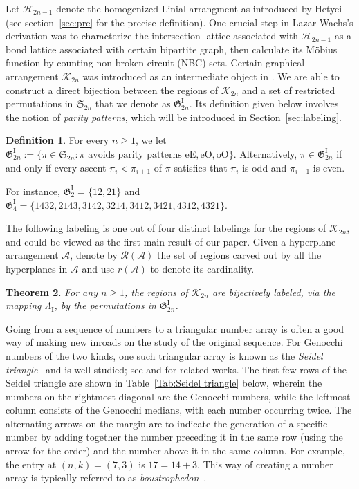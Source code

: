 \documentclass[11pt,reqno]{amsart}
\numberwithin{equation}{section}
\theoremstyle{plain}
\newtheorem{theorem}{Theorem}[section]
\theoremstyle{definition}
\newtheorem{Def}[theorem]{Definition}
\newcommand{\A}{\mathcal{A}}
\renewcommand{\S}{\mathfrak{S}}
\newcommand{\fG}{\mathfrak{G}}
\newcommand{\cH}{\mathcal{H}}
\newcommand{\cK}{\mathcal{K}}
\newcommand{\cR}{\mathcal{R}}
\newcommand{\GI}{\fG^{\mathrm{I}}}
\def\oO{\mathrm{oO}}
\def\eE{\mathrm{eE}}
\def\eO{\mathrm{eO}}
\begin{document}
Let $\cH_{2n-1}$ denote the homogenized Linial arrangment as introduced by Hetyei~\cite{het19} (see section~\ref{sec:pre} for the precise definition). One crucial step in Lazar-Wachs's derivation was to characterize the intersection lattice associated with $\cH_{2n-1}$ as a bond lattice associated with certain bipartite graph, then calculate its M\"obius function by counting non-broken-circuit (NBC) sets. Certain graphical arrangement $\cK_{2n}$ was introduced as an intermediate object in \cite[Thm.~3.2]{LW22}. We are able to construct a direct bijection between the regions of $\cK_{2n}$ and a set of restricted permutations in $\S_{2n}$ that we denote as $\GI_{2n}$. Its definition given below involves the notion of {\it parity patterns}, which will be introduced in Section~\ref{sec:labeling}. 

\begin{Def}\label{def:G-I}
	For every $n\ge 1$, we let $\GI_{2n} :=\{ \pi \in \S_{2n}: \pi \text{ avoids parity patterns }\eE,\eO,\oO \}$. Alternatively, $\pi \in \GI_{2n}$ if and only if every ascent $\pi_i<\pi_{i+1}$ of $\pi$ satisfies that $\pi_i$ is odd and $\pi_{i+1}$ is even.
\end{Def}

For instance, $\GI_2=\{12,21\}$ and $\GI_4=\{1432,2143,3142,3214,3412,3421,4312,4321\}$. 

The following labeling is one out of four distinct labelings for the regions of $\cK_{2n}$, and could be viewed as the first main result of our paper. Given a hyperplane arrangement $\A$, denote by $\cR(\A)$ the set of regions carved out by all the hyperplanes in $\A$ and use $r(\A)$ to denote its cardinality.

\begin{theorem}\label{thm:label-I}
For any $n\ge 1$, the regions of $\cK_{2n}$ are bijectively labeled, via the mapping $\Lambda_{\mathrm{I}}$, by the permutations in $\GI_{2n}$. 
\end{theorem}

Going from a sequence of numbers to a triangular number array is often a good way of making new inroads on the study of the original sequence. For Genocchi numbers of the two kinds, one such triangular array is known as the {\it Seidel triangle}~\cite{sei77} and is well studied; see \cite{ES00} and \cite{BJS10} for related works. The first few rows of the Seidel triangle are shown in Table~\ref{Tab:Seidel triangle} below, wherein the numbers on the rightmost diagonal are the Genocchi numbers, while the leftmost column consists of the Genocchi medians, with each number occurring twice. The alternating arrows on the margin are to indicate the generation of a specific number by adding together the number preceding it in the same row (using the arrow for the order) and the number above it in the same column. For example, the entry at $(n,k)=(7,3)$ is $17=14+3$. This way of creating a number array is typically referred to as {\it boustrophedon}~\cite{PZ23}.
\end{document}
